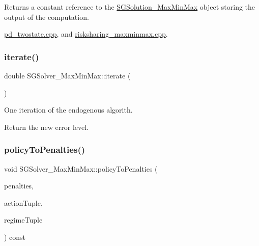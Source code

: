 Returns a constant reference to the \hyperlink{classSGSolution__MaxMinMax}{S\+G\+Solution\+\_\+\+Max\+Min\+Max} object storing the output of the computation. \begin{Desc}
\item[Examples\+: ]\par
\hyperlink{pd_twostate_8cpp-example}{pd\+\_\+twostate.\+cpp}, and \hyperlink{risksharing_maxminmax_8cpp-example}{risksharing\+\_\+maxminmax.\+cpp}.\end{Desc}
\mbox{\label{classSGSolver__MaxMinMax_ab8c5d13de6ad13e26a42f901d7e1d9c8}} 
\subsubsection{\texorpdfstring{iterate()}{iterate()}}
{\footnotesize\ttfamily double S\+G\+Solver\+\_\+\+Max\+Min\+Max\+::iterate (\begin{DoxyParamCaption}{ }\end{DoxyParamCaption})}



One iteration of the endogenous algorith. 

Return the new error level. \mbox{\label{classSGSolver__MaxMinMax_a66a941fb8232a6cd7d017aab2bc34ed2}} 
\subsubsection{\texorpdfstring{policy\+To\+Penalties()}{policyToPenalties()}}
{\footnotesize\ttfamily void S\+G\+Solver\+\_\+\+Max\+Min\+Max\+::policy\+To\+Penalties (\begin{DoxyParamCaption}\item[{vector$<$ double $>$ \&}]{penalties,  }\item[{const vector$<$ S\+G\+Action\+Iter $>$ \&}]{action\+Tuple,  }\item[{const vector$<$ \hyperlink{namespaceSG_a139e4dec41ea0f38aae1f93f60cfff60}{S\+G\+::\+Regime} $>$ \&}]{regime\+Tuple }\end{DoxyParamCaption}) const}

